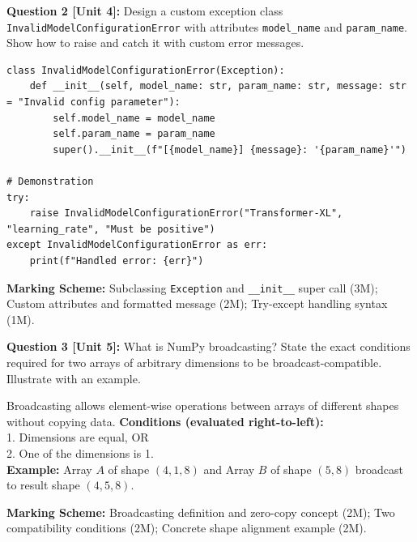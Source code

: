 \noindent\textbf{Question 2 [Unit 4]:} Design a custom exception class \texttt{InvalidModelConfigurationError} with attributes \texttt{model\_name} and \texttt{param\_name}. Show how to raise and catch it with custom error messages.
\begin{solutionbox}
\begin{lstlisting}
class InvalidModelConfigurationError(Exception):
    def __init__(self, model_name: str, param_name: str, message: str = "Invalid config parameter"):
        self.model_name = model_name
        self.param_name = param_name
        super().__init__(f"[{model_name}] {message}: '{param_name}'")

# Demonstration
try:
    raise InvalidModelConfigurationError("Transformer-XL", "learning_rate", "Must be positive")
except InvalidModelConfigurationError as err:
    print(f"Handled error: {err}")
\end{lstlisting}
\end{solutionbox}
\begin{markingrubric}
\textbf{Marking Scheme:} Subclassing \texttt{Exception} and \texttt{\_\_init\_\_} super call (3M); Custom attributes and formatted message (2M); Try-except handling syntax (1M).
\end{markingrubric}

\noindent\textbf{Question 3 [Unit 5]:} What is NumPy broadcasting? State the exact conditions required for two arrays of arbitrary dimensions to be broadcast-compatible. Illustrate with an example.
\begin{solutionbox}
Broadcasting allows element-wise operations between arrays of different shapes without copying data.
\textbf{Conditions (evaluated right-to-left):}\\
1. Dimensions are equal, OR\\
2. One of the dimensions is 1.\\
\textbf{Example:} Array $A$ of shape $(4, 1, 8)$ and Array $B$ of shape $(5, 8)$ broadcast to result shape $(4, 5, 8)$.
\end{solutionbox}
\begin{markingrubric}
\textbf{Marking Scheme:} Broadcasting definition and zero-copy concept (2M); Two compatibility conditions (2M); Concrete shape alignment example (2M).
\end{markingrubric}

